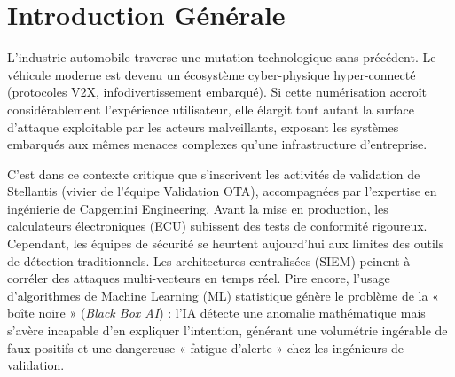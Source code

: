 \documentclass[a4paper, 12pt]{report}
\begin{document}
\tableofcontents

\newpage
\thispagestyle{empty}
\listoffigures

\newpage
\thispagestyle{empty}
\listoftables

\newpage
\thispagestyle{empty}
\lstlistoflistings

\newpage
\pagestyle{fancy}
\setcounter{page}{1}

\chapter*{Introduction Générale}

L'industrie automobile traverse une mutation technologique sans précédent. Le véhicule moderne est devenu un écosystème cyber-physique hyper-connecté (protocoles V2X, infodivertissement embarqué). Si cette numérisation accroît considérablement l'expérience utilisateur, elle élargit tout autant la surface d'attaque exploitable par les acteurs malveillants, exposant les systèmes embarqués aux mêmes menaces complexes qu'une infrastructure d'entreprise.

C'est dans ce contexte critique que s'inscrivent les activités de validation de Stellantis (vivier de l'équipe Validation OTA), accompagnées par l'expertise en ingénierie de Capgemini Engineering. Avant la mise en production, les calculateurs électroniques (ECU) subissent des tests de conformité rigoureux. Cependant, les équipes de sécurité se heurtent aujourd'hui aux limites des outils de détection traditionnels. Les architectures centralisées (SIEM) peinent à corréler des attaques multi-vecteurs en temps réel. Pire encore, l'usage d'algorithmes de Machine Learning (ML) statistique génère le problème de la « boîte noire » (\textit{Black Box AI}) : l'IA détecte une anomalie mathématique mais s'avère incapable d'en expliquer l'intention, générant une volumétrie ingérable de faux positifs et une dangereuse « fatigue d'alerte » chez les ingénieurs de validation.
\end{document}
